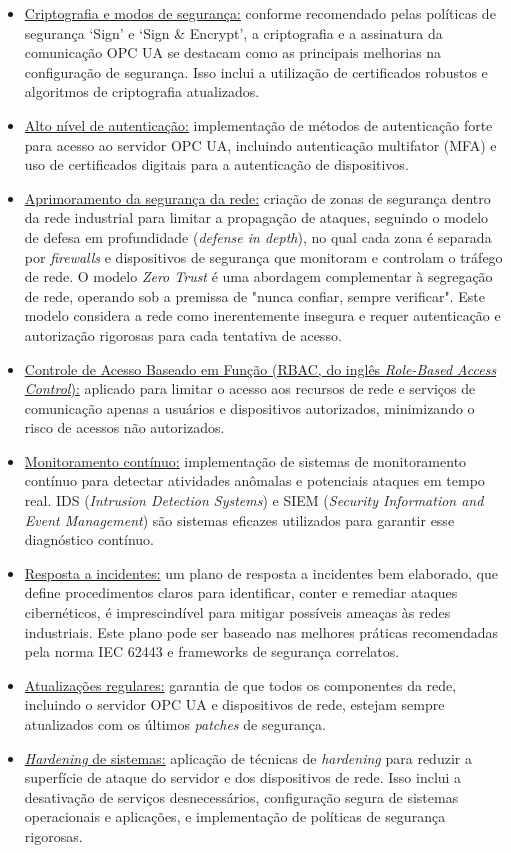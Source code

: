         \begin{itemize}
            \item \underline{Criptografia e modos de segurança:} conforme recomendado pelas políticas de segurança `Sign' e `Sign \& Encrypt', a criptografia e a assinatura da comunicação OPC UA se destacam como as principais melhorias na configuração de segurança. Isso inclui a utilização de certificados robustos e algoritmos de criptografia atualizados.
            \item \underline{Alto nível de autenticação:} implementação de métodos de autenticação forte para acesso ao servidor OPC UA, incluindo autenticação multifator (MFA) e uso de certificados digitais para a autenticação de dispositivos.
            \item \underline{Aprimoramento da segurança da rede:} criação de zonas de segurança dentro da rede industrial para limitar a propagação de ataques, seguindo o modelo de defesa em profundidade (\textit{defense in depth}), no qual cada zona é separada por \textit{firewalls} e dispositivos de segurança que monitoram e controlam o tráfego de rede. O modelo \textit{Zero Trust} é uma abordagem complementar à segregação de rede, operando sob a premissa de "nunca confiar, sempre verificar". Este modelo considera a rede como inerentemente insegura e requer autenticação e autorização rigorosas para cada tentativa de acesso.
            \item \underline{Controle de Acesso Baseado em Função (RBAC, do inglês \textit{Role-Based Access Control}):} aplicado para limitar o acesso aos recursos de rede e serviços de comunicação apenas a usuários e dispositivos autorizados, minimizando o risco de acessos não autorizados.
            \item \underline{Monitoramento contínuo:} implementação de sistemas de monitoramento contínuo para detectar atividades anômalas e potenciais ataques em tempo real. IDS (\textit{Intrusion Detection Systems}) e SIEM (\textit{Security Information and Event Management}) são sistemas eficazes utilizados para garantir esse diagnóstico contínuo.
            \item \underline{Resposta a incidentes:} um plano de resposta a incidentes bem elaborado, que define procedimentos claros para identificar, conter e remediar ataques cibernéticos, é imprescindível para mitigar possíveis ameaças às redes industriais. Este plano pode ser baseado nas melhores práticas recomendadas pela norma IEC 62443 e frameworks de segurança correlatos.
            \item \underline{Atualizações regulares:} garantia de que todos os componentes da rede, incluindo o servidor OPC UA e dispositivos de rede, estejam sempre atualizados com os últimos \textit{patches} de segurança.
            \item \underline{\textit{Hardening} de sistemas:} aplicação de técnicas de \textit{hardening} para reduzir a superfície de ataque do servidor e dos dispositivos de rede. Isso inclui a desativação de serviços desnecessários, configuração segura de sistemas operacionais e aplicações, e implementação de políticas de segurança rigorosas.
        \end{itemize}

